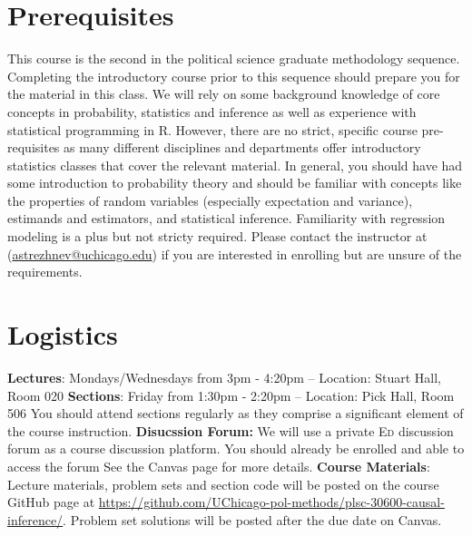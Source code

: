 \documentclass[11pt, article, oneside]{memoir}
\theoremstyle{Assumption}
\begin{document}
\section*{Prerequisites}

This course is the second in the political science graduate methodology sequence. Completing the introductory course prior to this sequence should prepare you for the material in this class. We will rely on some background knowledge of core concepts in probability, statistics and inference as well as experience with statistical programming in R. However, there are no strict, specific course pre-requisites as many different disciplines and departments offer introductory statistics classes that cover the relevant material. In general, you should have had some introduction to probability theory and should be familiar with concepts like the properties of random variables (especially expectation and variance), estimands and estimators, and statistical inference. Familiarity with regression modeling is a plus but not stricty required. Please contact the instructor at (\href{mailto:astrezhnev@uchicago.edu}{astrezhnev@uchicago.edu}) if you are interested in enrolling but are unsure of the requirements. 

\section*{Logistics}

\textbf{Lectures}: Mondays/Wednesdays from 3pm - 4:20pm -- Location: Stuart Hall, Room 020
\newline\textbf{Sections}: Friday from 1:30pm - 2:20pm -- Location: Pick Hall, Room 506
\newline\newline
You should attend sections regularly as they comprise a significant element of the course instruction.
\newline\newline \textbf{Disucssion Forum:} We will use a private \textsc{Ed} discussion forum as a course discussion platform. You should already be enrolled and able to access the forum  See the Canvas page for more details.
\newline\newline\textbf{Course Materials}: Lecture materials, problem sets and section code will be posted on the course GitHub page at \url{https://github.com/UChicago-pol-methods/plsc-30600-causal-inference/}. Problem set solutions will be posted after the due date on Canvas.
\end{document}
